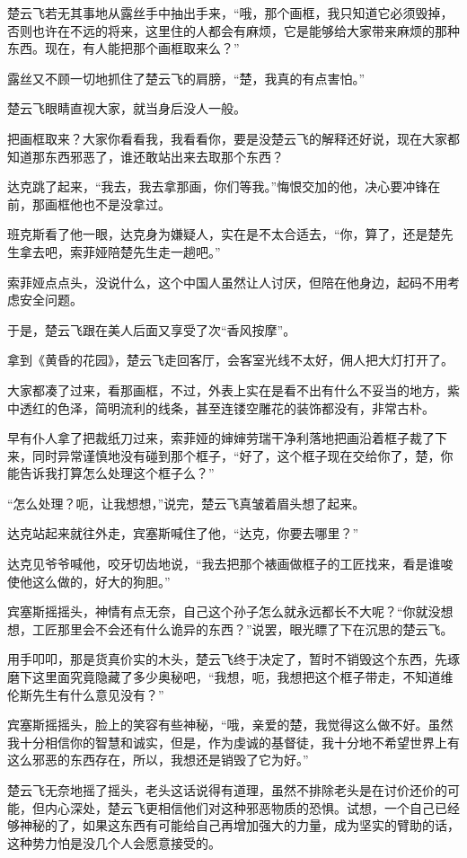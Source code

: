楚云飞若无其事地从露丝手中抽出手来，“哦，那个画框，我只知道它必须毁掉，否则也许在不远的将来，这里住的人都会有麻烦，它是能够给大家带来麻烦的那种东西。现在，有人能把那个画框取来么？”

露丝又不顾一切地抓住了楚云飞的肩膀，“楚，我真的有点害怕。”

楚云飞眼睛直视大家，就当身后没人一般。

把画框取来？大家你看看我，我看看你，要是没楚云飞的解释还好说，现在大家都知道那东西邪恶了，谁还敢站出来去取那个东西？

达克跳了起来，“我去，我去拿那画，你们等我。”悔恨交加的他，决心要冲锋在前，那画框他也不是没拿过。

班克斯看了他一眼，达克身为嫌疑人，实在是不太合适去，“你，算了，还是楚先生拿去吧，索菲娅陪楚先生走一趟吧。”

索菲娅点点头，没说什么，这个中国人虽然让人讨厌，但陪在他身边，起码不用考虑安全问题。

于是，楚云飞跟在美人后面又享受了次“香风按摩”。

拿到《黄昏的花园》，楚云飞走回客厅，会客室光线不太好，佣人把大灯打开了。

大家都凑了过来，看那画框，不过，外表上实在是看不出有什么不妥当的地方，紫中透红的色泽，简明流利的线条，甚至连镂空雕花的装饰都没有，非常古朴。

早有仆人拿了把裁纸刀过来，索菲娅的婶婶劳瑞干净利落地把画沿着框子裁了下来，同时异常谨慎地没有碰到那个框子，“好了，这个框子现在交给你了，楚，你能告诉我打算怎么处理这个框子么？”

“怎么处理？呃，让我想想，”说完，楚云飞真皱着眉头想了起来。

达克站起来就往外走，宾塞斯喊住了他，“达克，你要去哪里？”

达克见爷爷喊他，咬牙切齿地说，“我去把那个裱画做框子的工匠找来，看是谁唆使他这么做的，好大的狗胆。”

宾塞斯摇摇头，神情有点无奈，自己这个孙子怎么就永远都长不大呢？“你就没想想，工匠那里会不会还有什么诡异的东西？”说罢，眼光瞟了下在沉思的楚云飞。

用手叩叩，那是货真价实的木头，楚云飞终于决定了，暂时不销毁这个东西，先琢磨下这里面究竟隐藏了多少奥秘吧，“我想，呃，我想把这个框子带走，不知道维伦斯先生有什么意见没有？”

宾塞斯摇摇头，脸上的笑容有些神秘，“哦，亲爱的楚，我觉得这么做不好。虽然我十分相信你的智慧和诚实，但是，作为虔诚的基督徒，我十分地不希望世界上有这么邪恶的东西存在，所以，我想还是销毁了它为好。”

楚云飞无奈地摇了摇头，老头这话说得有道理，虽然不排除老头是在讨价还价的可能，但内心深处，楚云飞更相信他们对这种邪恶物质的恐惧。试想，一个自己已经够神秘的了，如果这东西有可能给自己再增加强大的力量，成为坚实的臂助的话，这种势力怕是没几个人会愿意接受的。

